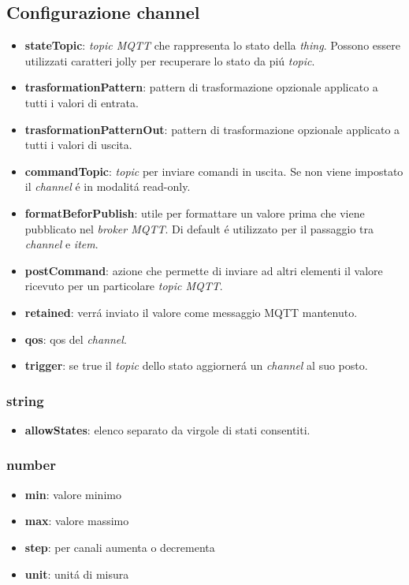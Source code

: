 \subsection{Configurazione channel}
\begin{itemize}
    \item \textbf{stateTopic}: {\em topic MQTT} che rappresenta lo stato della {\em thing}. Possono essere utilizzati caratteri jolly per recuperare lo stato da pi\'u {\em topic}.
    \item \textbf{trasformationPattern}: pattern di trasformazione opzionale applicato a tutti i valori di entrata.
    \item \textbf{trasformationPatternOut}: pattern di trasformazione opzionale applicato a tutti i valori di uscita.
    \item \textbf{commandTopic}: {\em topic} per inviare comandi in uscita. Se non viene impostato il {\em channel} \'e in modalit\'a read-only.
    \item \textbf{formatBeforPublish}: utile per formattare un valore prima che viene pubblicato nel {\em broker MQTT}. Di default \'e utilizzato per il passaggio tra {\em channel} e {\em item}.
    \item \textbf{postCommand}: azione che permette di inviare ad altri elementi il valore ricevuto per un particolare {\em topic MQTT}.
    \item \textbf{retained}: verr\'a inviato il valore come messaggio MQTT mantenuto.
    \item \textbf{qos}: qos del {\em channel}.
    \item \textbf{trigger}: se true il {\em topic} dello stato aggiorner\'a un {\em channel} al suo posto.
\end{itemize}

\subsubsection{string}
\begin{itemize}
    \item \textbf{allowStates}: elenco separato da virgole di stati consentiti.
\end{itemize}


\subsubsection{number}
\begin{itemize}
    \item \textbf{min}: valore minimo
    \item \textbf{max}: valore massimo
    \item \textbf{step}: per canali aumenta o decrementa
    \item \textbf{unit}: unit\'a di misura
\end{itemize}

